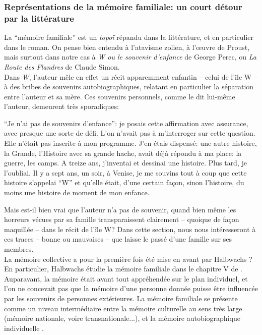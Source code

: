\documentclass[french]{article}
\begin{document}
			\subsubsection{Représentations de la mémoire familiale: un court détour par la littérature}
			La ``mémoire familiale'' est un \textit{topoï} répandu dans la littérature, et en particulier dans le roman. On pense bien entendu à l'atavisme zolien, à l'œuvre de Proust, mais surtout dans notre cas à \textit{W ou le souvenir d'enfance} de George Perec, ou \textit{La Route des Flandres} de Claude Simon.\\
			Dans \textit{W}, l'auteur mêle en effet un récit apparemment enfantin -- celui de l'île W -- à des bribes de souvenirs autobiographiques, relatant en particulier la séparation entre l'auteur et sa mère. Ces souvenirs personnels, comme le dit lui-même l'auteur, demeurent très sporadiques:
			\begin{center}
				\begin{minipage}{.7\textwidth}
				``Je n'ai pas de souvenirs d'enfance'': je posais cette affirmation avec assurance, avec presque une sorte de défi. L'on n'avait pas à m'interroger sur cette question. Elle n'était pas inscrite à mon programme. J'en étais dispensé: une autre histoire, la Grande, l'Histoire avec sa grande hache, avait déjà répondu à ma place: la guerre, les camps. A treize ans, j'inventai et dessinai une histoire. Plus tard, je l'oubliai. Il y a sept ans, un soir, à Venise, je me souvins tout à coup que cette histoire s'appelai ``W'' et qu'elle était, d'une certain façon, sinon l'histoire, du moins une histoire de moment de mon enfance.
			\end{minipage}
			\end{center}
			Mais est-il bien vrai que l'auteur n'a pas de souvenir, quand bien même les horreurs vécues par sa famille transparaissent clairement -- quoique de façon maquillée -- dans le récit de l'île W? Dans cette section, nous nous intéresseront à ces traces -- bonne ou mauvaises -- que laisse le passé d'une famille sur ses membres. \\
			
			La mémoire collective a pour la première fois été mise en avant par Halbwachs \cite{halbwachs1925,halbwachs1950}? En particulier, Halbwachs étudie la mémoire familiale dans le chapitre V de \cite{halbwachs1925}. Auparavant, la mémoire était avant tout appréhendée sur le plan individuel, et l'on ne concevait pas que la mémoire d'une personne donnée puisse être influencée par les souvenirs de personnes extérieures. La mémoire familiale se présente comme un niveau intermédiaire entre la mémoire culturelle au sens très large (mémoire nationale, voire transnationale...), et la mémoire autobiographique individuelle \cite{boesen2012}.\\
			
\end{document}

